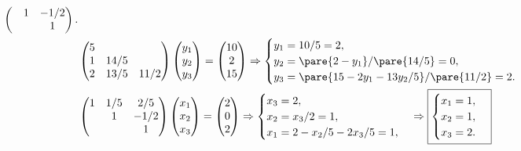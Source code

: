 \documentclass[hidelinks]{ctexart}
\begin{document}
\begin{align*}
\begin{pmatrix}
        & 1 & -1/2 \\
        & & 1
    \end{pmatrix}. \\
\hspace{-3em} & \begin{pmatrix}
        5 & & \\
        1 & 14/5 & \\
        2 & 13/5 & 11/2
    \end{pmatrix}\begin{pmatrix}
        y_1 \\ y_2 \\ y_3
    \end{pmatrix} = \begin{pmatrix}
        10 \\ 2 \\ 15
    \end{pmatrix} \Rightarrow \begin{cases}
        y_1 = 10/5 = 2, \\
        y_2 = \pare{2 - y_1}/\pare{14/5} = 0, \\
        y_3 = \pare{15 - 2y_1 - 13y_2/5}/\pare{11/2} = 2.
    \end{cases} \\
\hspace{-3em} & \begin{pmatrix}
        1 & 1/5 & 2/5 \\
        & 1 & -1/2 \\
        & & 1
    \end{pmatrix}\begin{pmatrix}
        x_1 \\ x_2 \\ x_3
    \end{pmatrix} = \begin{pmatrix}
        2 \\ 0 \\ 2
    \end{pmatrix} \Rightarrow \begin{cases}
        x_3 = 2, \\
        x_2 = x_3/2 = 1, \\
        x_1 = 2 - x_2/5 - 2x_3/5 = 1,
    \end{cases} \Rightarrow \boxed{\begin{cases}
        x_1 = 1, \\
        x_2 = 1, \\
        x_3 = 2.
    \end{cases}}
\end{align*}
\end{document}
